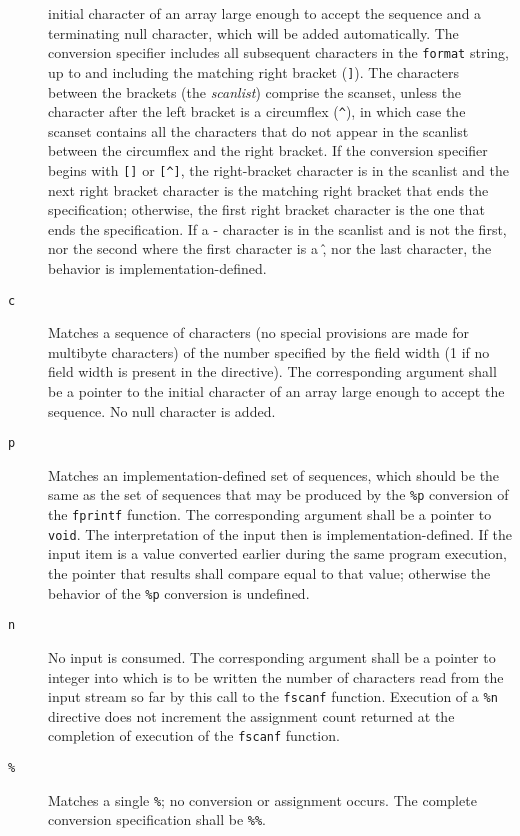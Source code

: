 \begin{description}
initial character of an array large enough to accept the sequence and a
terminating null character, which will be added automatically. The conversion
specifier includes all subsequent characters in the \texttt{format} string, up
to and including the matching right bracket (\texttt{]}). The characters
between the brackets (the \emph{scanlist}) comprise the scanset, unless the
character after the left bracket is a circumflex (\texttt{\^{}}), in which case
the scanset contains all the characters that do not appear in the scanlist
between the circumflex and the right bracket. If the conversion specifier
begins with \texttt{[]} or \texttt{[\^{}]}, the right-bracket character is in
the scanlist and the next right bracket character is the matching right bracket
that ends the specification; otherwise, the first right bracket character is
the one that ends the specification. If a - character is in the scanlist and is
not the first, nor the second where the first character is a \^, nor the last
character, the behavior is implementation-defined.
	\item[\texttt{c}] Matches a sequence of characters (no special provisions
are made for multibyte characters) of the number specified by the field width
(1 if no field width is present in the directive). The corresponding argument
shall be a pointer to the initial character of an array large enough to accept
the sequence. No null character is added.
	\item[\texttt{p}] Matches an implementation-defined set of sequences, which
should be the same as the set of sequences that may be produced by the
\texttt{\%p} conversion of the \texttt{fprintf} function. The corresponding
argument shall be a pointer to \texttt{void}. The interpretation of the input
then is implementation-defined. If the input item is a value converted earlier
during the same program execution, the pointer that results shall compare equal
to that value; otherwise the behavior of the \texttt{\%p} conversion is
undefined.
	\item[\texttt{n}] No input is consumed. The corresponding argument shall be
a pointer to integer into which is to be written the number of characters read
from the input stream so far by this call to the \texttt{fscanf} function.
Execution of a \texttt{\%n} directive does not increment the assignment count
returned at the completion of execution of the \texttt{fscanf} function.
	\item[\texttt{\%}] Matches a single \texttt{\%}; no conversion or
assignment occurs. The complete conversion specification shall be
\texttt{\%\%}.
\end{description}


